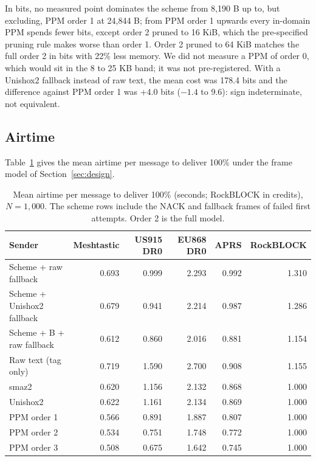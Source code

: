 \documentclass[11pt]{article}
\begin{document}
In bits, no measured point dominates the scheme from 8,190 B up to, but excluding, PPM order 1 at
24,844 B; from PPM order 1 upwards every in-domain PPM spends fewer bits, except order 2 pruned to
16 KiB, which the pre-specified pruning rule makes worse than order 1. Order 2 pruned to 64 KiB
matches the full order 2 in bits with 22\% less memory. We did not measure a PPM of order 0, which
would sit in the 8 to 25 KB band; it was not pre-registered. With a Unishox2 fallback instead of raw
text, the mean cost was 178.4 bits and the difference against PPM order 1 was +4.0 bits ($-1.4$ to
9.6): sign indeterminate, not equivalent.

\subsection{Airtime}

Table~\ref{tab:airtime} gives the mean airtime per message to deliver 100\% under the frame model of
Section~\ref{sec:design}.

\begin{table}[t]
\centering
\caption{Mean airtime per message to deliver 100\% (seconds; RockBLOCK in credits), $N = 1{,}000$. The
scheme rows include the NACK and fallback frames of failed first attempts. Order 2 is the full
model.}
\label{tab:airtime}
\small
\begin{tabular}{lrrrrr}
\toprule
Sender & Meshtastic & US915 DR0 & EU868 DR0 & APRS & RockBLOCK \\
\midrule
Scheme + raw fallback & 0.693 & 0.999 & 2.293 & 0.992 & 1.310 \\
Scheme + Unishox2 fallback & 0.679 & 0.941 & 2.214 & 0.987 & 1.286 \\
Scheme + B + raw fallback & 0.612 & 0.860 & 2.016 & 0.881 & 1.154 \\
\midrule
Raw text (tag only) & 0.719 & 1.590 & 2.700 & 0.908 & 1.155 \\
smaz2 & 0.620 & 1.156 & 2.132 & 0.868 & 1.000 \\
Unishox2 & 0.622 & 1.161 & 2.134 & 0.869 & 1.000 \\
PPM order 1 & 0.566 & 0.891 & 1.887 & 0.807 & 1.000 \\
PPM order 2 & 0.534 & 0.751 & 1.748 & 0.772 & 1.000 \\
PPM order 3 & 0.508 & 0.675 & 1.642 & 0.745 & 1.000 \\
\bottomrule
\end{tabular}
\end{table}
\end{document}
